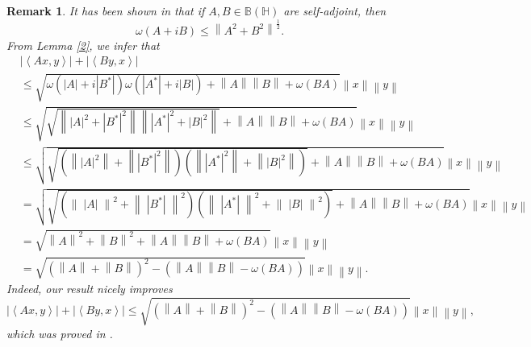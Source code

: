 \documentclass[12pt,twoside,reqno]{amsart}
\newtheorem{remark}{Remark}[section]
\numberwithin{equation}{section}
\begin{document}
\begin{remark}\label{Rem_1_Bet1}
It has been shown in \cite[Proposition 1.4]{1} that if $A,B\in \mathbb B\left( \mathbb H \right)$ are self-adjoint, then
\begin{equation}\label{Eq_Fil}
\omega \left( A+iB \right)\le {{\left\| {{A}^{2}}+{{B}^{2}} \right\|}^{\frac{1}{2}}}.
\end{equation}
From Lemma \ref{2}, we infer that
\[\begin{aligned}
  & \left| \left\langle Ax,y \right\rangle  \right|+\left| \left\langle By,x \right\rangle  \right| \\ 
 & \le \sqrt{\omega \left( \left| A \right|+i\left| {{B}^{*}} \right| \right)\omega \left( \left| {{A}^{*}} \right|+i\left| B \right| \right)+\left\| A \right\|\left\| B \right\|+\omega \left( BA \right)}\left\| x \right\|\left\| y \right\| \\ 
 & \le \sqrt{\sqrt{\left\| {{\left| A \right|}^{2}}+{{\left| {{B}^{*}} \right|}^{2}} \right\|\left\| {{\left| {{A}^{*}} \right|}^{2}}+{{\left| B \right|}^{2}} \right\|}+\left\| A \right\|\left\| B \right\|+\omega \left( BA \right)}\left\| x \right\|\left\| y \right\| \\ 
 & \le \sqrt{\sqrt{\left( \left\| {{\left| A \right|}^{2}} \right\|+\left\| {{\left| {{B}^{*}} \right|}^{2}} \right\| \right)\left( \left\| {{\left| {{A}^{*}} \right|}^{2}} \right\|+\left\| {{\left| B \right|}^{2}} \right\| \right)}+\left\| A \right\|\left\| B \right\|+\omega \left( BA \right)}\left\| x \right\|\left\| y \right\| \\ 
 & =\sqrt{\sqrt{\left( {{\left\| \;\left| A \right| \;\right\|}^{2}}+{{\left\| \;\left| {{B}^{*}} \right| \;\right\|}^{2}} \right)\left( {{\left\| \;\left| {{A}^{*}} \right| \;\right\|}^{2}}+{{\left\|\; \left| B \right| \;\right\|}^{2}} \right)}+\left\| A \right\|\left\| B \right\|+\omega \left( BA \right)}\left\| x \right\|\left\| y \right\| \\ 
 & =\sqrt{{{\left\| A \right\|}^{2}}+{{\left\| B \right\|}^{2}}+\left\| A \right\|\left\| B \right\|+\omega \left( BA \right)}\left\| x \right\|\left\| y \right\| \\ 
 & =\sqrt{{{\left( \left\| A \right\|+\left\| B \right\| \right)}^{2}}-\left( \left\| A \right\|\left\| B \right\|-\omega \left( BA \right) \right)}\left\| x \right\|\left\| y \right\|.
\end{aligned}\]
Indeed, our result nicely improves
\[\left| \left\langle Ax,y \right\rangle  \right|+\left| \left\langle By,x \right\rangle  \right|\le \sqrt{{{\left( \left\| A \right\|+\left\| B \right\| \right)}^{2}}-\left( \left\| A \right\|\left\| B \right\|-\omega \left( BA \right) \right)}\left\| x \right\|\left\| y \right\|,\]
which was proved in \cite[Lemma 2.2]{2}.
\end{remark}
\end{document}
